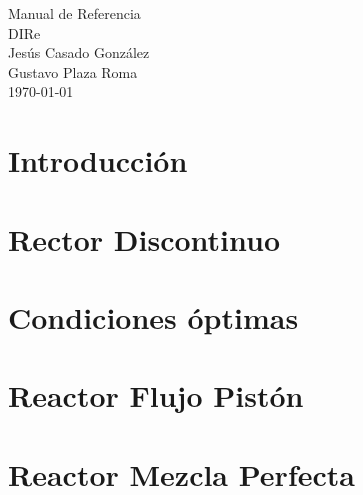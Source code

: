 \documentclass[a4paper]{report}
\begin{document}
\hypersetup{pageanchor=false}
\begin{titlepage}
\vspace*{7cm}
\begin{center}
{\Huge Manual de Referencia}\\
\vspace*{1cm}
{\Huge DIRe}\\
\vspace*{1cm}
{\LARGE Jesús Casado González}\\
\vspace*{0.5cm}
{\LARGE Gustavo Plaza Roma}\\
\vspace*{0.5cm}
{\Large \today}\\
\end{center}
\end{titlepage}
{}
\tableofcontents
{}
\hypersetup{pageanchor=true}
\chapter{Introducción}

\chapter{Rector Discontinuo}

\chapter{Condiciones óptimas}


\chapter{Reactor Flujo Pistón}

\printindex
\chapter{Reactor Mezcla Perfecta}


\printindex
\end{document}
